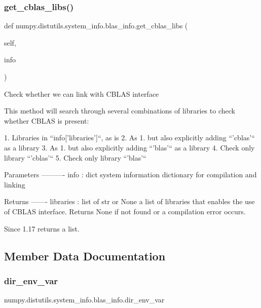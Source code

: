 \subsubsection{\texorpdfstring{get\+\_\+cblas\+\_\+libs()}{get\_cblas\_libs()}}
{\footnotesize\ttfamily def numpy.\+distutils.\+system\+\_\+info.\+blas\+\_\+info.\+get\+\_\+cblas\+\_\+libs (\begin{DoxyParamCaption}\item[{}]{self,  }\item[{}]{info }\end{DoxyParamCaption})}

\begin{DoxyVerb}Check whether we can link with CBLAS interface

This method will search through several combinations of libraries
to check whether CBLAS is present:

1. Libraries in ``info['libraries']``, as is
2. As 1. but also explicitly adding ``'cblas'`` as a library
3. As 1. but also explicitly adding ``'blas'`` as a library
4. Check only library ``'cblas'``
5. Check only library ``'blas'``

Parameters
----------
info : dict
   system information dictionary for compilation and linking

Returns
-------
libraries : list of str or None
    a list of libraries that enables the use of CBLAS interface.
    Returns None if not found or a compilation error occurs.

    Since 1.17 returns a list.
\end{DoxyVerb}
 

\subsection{Member Data Documentation}
\mbox{\label{classnumpy_1_1distutils_1_1system__info_1_1blas__info_a0f214a8b756d2ceaa311ef8d9ad6b765}} 
\subsubsection{\texorpdfstring{dir\+\_\+env\+\_\+var}{dir\_env\_var}}
{\footnotesize\ttfamily numpy.\+distutils.\+system\+\_\+info.\+blas\+\_\+info.\+dir\+\_\+env\+\_\+var\hspace{0.3cm}{\ttfamily [static]}}

